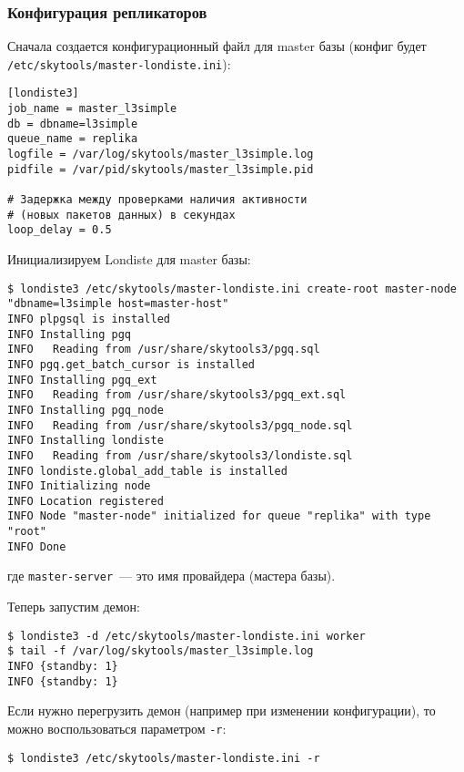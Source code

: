 \subsubsection{Конфигурация репликаторов}

Сначала создается конфигурационный файл для master базы (конфиг будет \lstinline!/etc/skytools/master-londiste.ini!):

\begin{lstlisting}[label=lst:londiste-replica1,caption=Конфигурация репликаторов]
[londiste3]
job_name = master_l3simple
db = dbname=l3simple
queue_name = replika
logfile = /var/log/skytools/master_l3simple.log
pidfile = /var/pid/skytools/master_l3simple.pid

# Задержка между проверками наличия активности
# (новых пакетов данных) в секундах
loop_delay = 0.5
\end{lstlisting}

Инициализируем Londiste для master базы:

\begin{lstlisting}[label=lst:londiste-replica2,caption=Инициализируем Londiste]
$ londiste3 /etc/skytools/master-londiste.ini create-root master-node "dbname=l3simple host=master-host"
INFO plpgsql is installed
INFO Installing pgq
INFO   Reading from /usr/share/skytools3/pgq.sql
INFO pgq.get_batch_cursor is installed
INFO Installing pgq_ext
INFO   Reading from /usr/share/skytools3/pgq_ext.sql
INFO Installing pgq_node
INFO   Reading from /usr/share/skytools3/pgq_node.sql
INFO Installing londiste
INFO   Reading from /usr/share/skytools3/londiste.sql
INFO londiste.global_add_table is installed
INFO Initializing node
INFO Location registered
INFO Node "master-node" initialized for queue "replika" with type "root"
INFO Done
\end{lstlisting}

где \lstinline!master-server!~--- это имя провайдера (мастера базы).

Теперь запустим демон:

\begin{lstlisting}[label=lst:londiste-replica3,caption=Запускаем демон для master базы]
$ londiste3 -d /etc/skytools/master-londiste.ini worker
$ tail -f /var/log/skytools/master_l3simple.log
INFO {standby: 1}
INFO {standby: 1}
\end{lstlisting}

Если нужно перегрузить демон (например при изменении конфигурации), то можно воспользоваться параметром \lstinline!-r!:

\begin{lstlisting}[label=lst:londiste-replica4,caption=Перегрузка демона]
$ londiste3 /etc/skytools/master-londiste.ini -r
\end{lstlisting}


